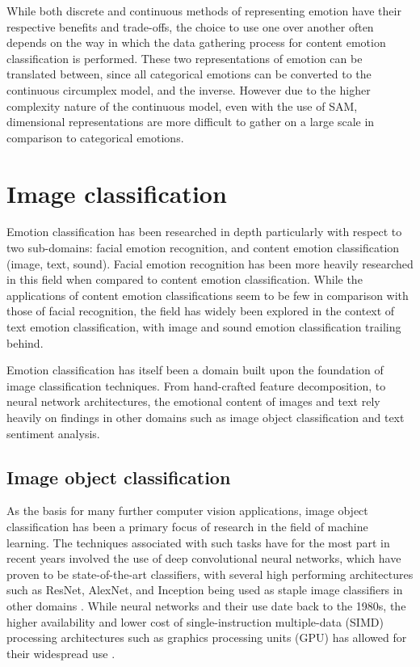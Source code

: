 \documentclass{article}
\begin{document}
While both discrete and continuous methods of representing emotion have their respective benefits and trade-offs, the choice to use one over another often depends on the way in which the data gathering process for content emotion classification is performed.
These two representations of emotion can be translated between, since all categorical emotions can be converted to the continuous circumplex model, and the inverse.
However due to the higher complexity nature of the continuous model, even with the use of SAM, dimensional representations are more difficult to gather on a large scale in comparison to categorical emotions.


\section{Image classification}

Emotion classification has been researched in depth particularly with respect to two sub-domains: facial emotion recognition, and content emotion classification (image, text, sound).
Facial emotion recognition has been more heavily researched in this field when compared to content emotion classification.
While the applications of content emotion classifications seem to be few in comparison with those of facial recognition, the field has widely been explored in the context of text emotion classification, with image and sound emotion classification trailing behind.

Emotion classification has itself been a domain built upon the foundation of image classification techniques.
From hand-crafted feature decomposition, to neural network architectures, the emotional content of images and text rely heavily on findings in other domains such as image object classification and text sentiment analysis.

\subsection{Image object classification}

As the basis for many further computer vision applications, image object classification has been a primary focus of research in the field of machine learning.
The techniques associated with such tasks have for the most part in recent years involved the use of deep convolutional neural networks, which have proven to be state-of-the-art classifiers, with several high performing architectures such as ResNet, AlexNet, and Inception being used as staple image classifiers in other domains \citep{pan2009survey}.
While neural networks and their use date back to the 1980s, the higher availability and lower cost of single-instruction multiple-data (SIMD) processing architectures such as graphics processing units (GPU) has allowed for their widespread use \citep{rawat2017deep}.
\end{document}
